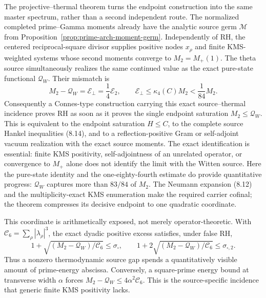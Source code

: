 \documentclass[11pt]{article}
\begin{document}
The projective--thermal theorem turns the endpoint construction into the same master spectrum,
rather than a second independent route.  The normalized completed prime--Gamma moments already
have the analytic source germ $\mathcal M$ from
Proposition~\ref{prop:prime-arch-moment-germ}.  Independently of RH, the centered
reciprocal-square divisor supplies positive nodes $x_\rho$ and finite KMS-weighted systems whose
second moments converge to $M_2=M_+(1)$.  The theta source simultaneously realizes the same
continued value as the exact pure-state functional $\mathcal Q_W$.  Their mismatch is
\[
 M_2-\mathcal Q_W=\mathcal E_\perp=\frac14\mathcal E_2,
 \qquad
 \mathcal E_\perp\le\kappa_4(C)M_2<\frac1{84}M_2.
\]
Consequently a Connes-type construction carrying this exact source--thermal incidence proves RH
as soon as it proves the single endpoint saturation $M_2\le\mathcal Q_W$.  This is equivalent to the
endpoint saturation $H\le C$, to the complete source Hankel inequalities \textup{(8.14)}, and to
a reflection-positive Gram or self-adjoint vacuum realization with the exact source moments.
The exact identification is essential: finite KMS positivity, self-adjointness of an unrelated
operator, or convergence to $M_+$ alone does not identify the limit with the Witten source.
Here the pure-state identity and the one-eighty-fourth estimate do provide quantitative progress:
$\mathcal Q_W$ captures more than $83/84$ of $M_2$.  The Neumann expansion \textup{(8.12)} and
the multiplicity-exact KMS enumeration make the required carrier cofinal; the theorem compresses
its decisive endpoint to one quadratic coordinate.

This coordinate is arithmetically exposed, not merely operator-theoretic.  With
$\mathcal C_6=\sum_\rho|\lambda_\rho|^3$, the exact dyadic positive excess satisfies, under
false RH,
\[
 1+\sqrt{(M_2-\mathcal Q_W)/\mathcal C_6}\le\sigma_\square,
 \qquad
 1+2\sqrt{(M_2-\mathcal Q_W)/\mathcal C_6}\le\sigma_{\square,2}.
 \tag{10.0}
\]
Thus a nonzero thermodynamic source gap spends a quantitatively visible amount of prime-energy
abscissa.  Conversely, a square-prime energy bound at transverse width $\alpha$ forces
$M_2-\mathcal Q_W\le4\alpha^2\mathcal C_6$.  This is the source-specific incidence that generic
finite KMS positivity lacks.
\end{document}
